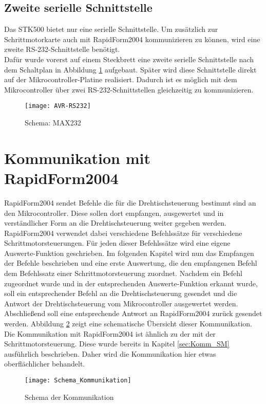 \subsection{Zweite serielle Schnittstelle}
Das STK500 bietet nur eine serielle Schnittstelle. Um zusätzlich zur Schrittmotorkarte auch mit RapidForm2004 kommunizieren zu können, wird eine zweite RS-232-Schnittstelle benötigt.\\
Dafür wurde vorerst auf einem Steckbrett eine zweite serielle Schnittstelle nach dem Schaltplan in Abbildung \ref{fig:MAX232} aufgebaut. Später wird diese Schnittstelle direkt auf der Mikrocontroller-Platine realisiert.
Dadurch ist es möglich mit dem Mikrocontroller über zwei RS-232-Schnittstellen gleichzeitig zu kommunizieren.
\begin{figure}[h]
\centering
\texttt{[image: AVR-RS232]}
\caption{Schema: MAX232}
\label{fig:MAX232}
\citep{uC:RS232}
\end{figure}

\section{Kommunikation mit RapidForm2004}
\label{sec:Komm_RF2004}
RapidForm2004 sendet Befehle die für die Drehtischsteuerung bestimmt sind an den Mikrocontroller. Diese sollen dort empfangen, ausgewertet und in verständlicher Form an die Drehtischsteuerung weiter gegeben werden. RapidForm2004 verwendet dabei verschiedene Befehlssätze für verschiedene Schrittmotorsteuerungen. Für jeden dieser Befehlssätze wird eine eigene Auswerte-Funktion geschrieben. Im folgenden Kapitel wird nun das Empfangen der Befehle beschrieben und eine erste Auswertung, die den empfangenen Befehl dem Befehlssatz einer Schrittmotorsteuerung zuordnet. 
Nachdem ein Befehl zugeordnet wurde und in der entsprechenden Auswerte-Funktion erkannt wurde, soll ein entsprechender Befehl an die Drehtischsteuerung gesendet und die Antwort der Drehtischsteuerung vom Mikrocontroller ausgewertet werden. Abschließend soll eine entsprechende Antwort an RapidForm2004 zurück gesendet werden. Abbildung \ref{fig:Schema_Komm} zeigt eine schematische Übersicht dieser Kommunikation.\\
Die Kommunikation mit RapidForm2004 ist ähnlich zu der mit der Schrittmotorsteuerung. Diese wurde bereits in Kapitel \ref{sec:Komm_SM} ausführlich beschrieben. Daher wird die Kommunikation hier etwas oberflächlicher behandelt.
\begin{figure}[h]
\centering
\texttt{[image: Schema\_Kommunikation]}
\caption{Schema der Kommunikation}
\label{fig:Schema_Komm}
\end{figure}

